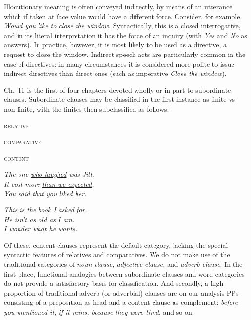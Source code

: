 Illocutionary meaning is often conveyed indirectly, by means of an utterance which if taken at face value would have a different force. Consider, for example, \textit{Would you like to close the window}. Syntactically, this is a closed interrogative, and in its literal interpretation it has the force of an inquiry (with \textit{Yes} and \textit{No} as answers). In practice, however, it is most likely to be used as a directive, a request to close the window. Indirect speech acts are particularly common in the case of directives: in many circumstances it is considered more polite to issue indirect directives than direct ones (such as imperative \textit{Close the window}).


Ch.~11 is the first of four chapters devoted wholly or in part to subordinate clauses. Subordinate clauses may be classified in the first instance as finite vs non-finite, with the finites then subclassified as follows:
\begin{examples}
\item \label{ex:34i}
\noindent\begin{minipage}[t]{0.25\linewidth}\vspace{-6pt}
    \begin{examples}
        \item\textsc{relative}
        \item\textsc{comparative}
        \item\textsc{content}
    \end{examples}
\end{minipage}
\begin{minipage}[t]{0.4\linewidth}
    \textit{The one \uline{who laughed} was Jill.}\\
    \textit{It cost more \uline{than we expected}.}\\
    \textit{You said \uline{that you liked her}.}
\end{minipage}
\noindent\begin{minipage}[t]{0.4\linewidth}
\textit{This is the book \uline{I asked for}.}\\
\textit{He isn't as old as \uline{I am}.}\\
\textit{I wonder \uline{what he wants}.}
\end{minipage}
\end{examples}
Of these, {content clauses} represent the default category, lacking the special syntactic features of relatives and comparatives. We do not make use of the traditional categories of \textit{noun clause, adjective clause,} and \textit{adverb clause}. In the first place, functional analogies between subordinate clauses and word categories do not provide a satisfactory basis for classification. And secondly, a high proportion of traditional adverb (or adverbial) clauses are on our analysis PPs consisting of a preposition as head and a content clause as complement: \textit{before you mentioned it, if it rains, because they were tired}, and so on.

